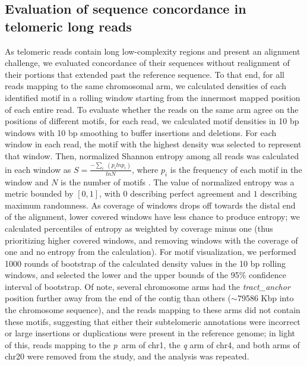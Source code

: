 \documentclass{article}
\begin{document}
\subsection*{Evaluation of sequence concordance in telomeric long reads}
    As telomeric reads contain long low-complexity regions and present an alignment challenge,
        we evaluated concordance of their sequences without realignment of their portions that extended past the reference sequence.
    To that end, for all reads mapping to the same chromosomal arm,
        we calculated densities of each identified motif in a rolling window starting from the innermost mapped position of each entire read.
    To evaluate whether the reads on the same arm agree on the positions of different motifs,
        for each read, we calculated motif densities in 10 bp windows with 10 bp smoothing to buffer insertions and deletions.
    For each window in each read,
        the motif with the highest density was selected to represent that window.
    Then, normalized Shannon entropy among all reads was calculated in each window as $ S = \frac{ - \sum_{i} \; ( p_{i} ln p_{i} )}{ln N} $,
        where $ p_{i} $ is the frequency of each motif in the window and $ N $ is the number of motifs \parencite{hepc_entropy}.
    The value of normalized entropy was a metric bounded by $ [ 0, 1 ] $,
        with $ 0 $ describing perfect agreement and $ 1 $ describing maximum randomness.
    As coverage of windows drops off towards the distal end of the alignment,
        lower covered windows have less chance to produce entropy;
        we calculated percentiles of entropy as weighted by coverage minus one
        (thus prioritizing higher covered windows, and removing windows with the coverage of one and no entropy from the calculation).
    For motif visualization,
        we performed 1000 rounds of bootstrap of the calculated density values in the 10 bp rolling windows,
            and selected the lower and the upper bounds of the 95\% confidence interval of bootstrap.
    Of note, several chromosome arms had the \textit{tract\_anchor} position further away from the end of the contig than others
            ($\sim$79\textendash{}586 Kbp into the chromosome sequence),
        and the reads mapping to these arms did not contain these motifs,
        suggesting that
            either their subtelomeric annotations were incorrect
            or large insertions or duplications were present in the reference genome;
        in light of this, reads mapping to
            the \mbox{\textit{p} arm} of chr1,
            the \textit{q} arm of chr4,
            and both arms of chr20
        were removed from the study,
        and the analysis was repeated.
\end{document}
